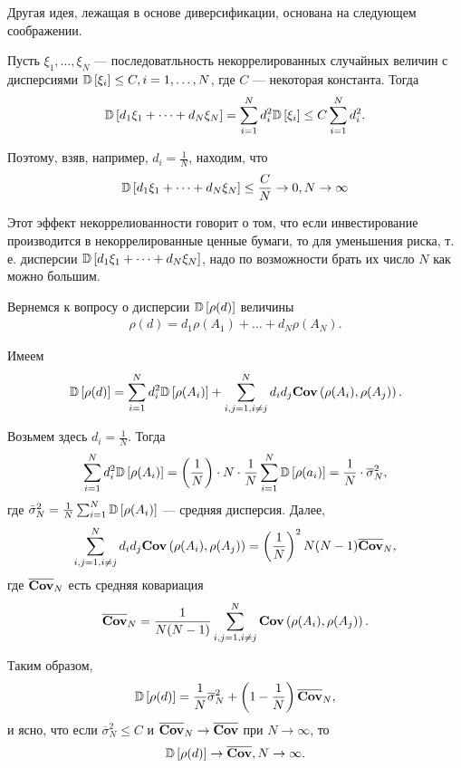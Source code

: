 Другая идея, лежащая в основе диверсификации, основана на следующем соображении.

Пусть $\xi_1, \dots, \xi_N$ --- последоватльность некоррелированных случайных величин с дисперсиями $\mathbb{D}\left[\xi_i\right] \le C, i=1, \dots, N$, 
где $C$ --- некоторая константа. Тогда
\begin{align}
\mathbb{D}\left[d_1 \xi_1 + \dots + d_N \xi_N\right] = \sum_{i=1}^{N} d_i^2 \mathbb{D}\left[\xi_i\right] \le C \sum_{i=1}^{N} d_i^2 .
\end{align}

Поэтому, взяв, например, $d_i = \frac{1}{N}$, находим, что
\begin{align}
\mathbb{D}\left[d_1 \xi_1 + \dots + d_N \xi_N\right] \le \frac{C}{N} \rightarrow 0, N \rightarrow \infty
\end{align}

Этот эффект некоррелиованности говорит о том, что если инвестирование производится в некоррелированные ценные бумаги, то для уменьшения риска,
т. е. дисперсии $\mathbb{D}\left[d_1 \xi_1 + \dots + d_N \xi_N\right]$, надо по возможности брать их число $N$ как можно большим.

Вернемся к вопросу о дисперсии $\mathbb{D}\left[\rho(d)\right]$ величины
\begin{align}
\rho(d) = d_1 \rho(A_1) + \dots + d_N \rho(A_N) .
\end{align}

Имеем
\begin{align}
\mathbb{D}\left[\rho(d)\right] = \sum_{i=1}^{N} d_i^2 \mathbb{D}\left[\rho(A_i)\right] + \sum_{i, j = 1, i \ne j}^{N} d_i d_j \textbf{Cov}\left(\rho(A_i), \rho(A_j)\right) .
\end{align}

Возьмем здесь $d_i = \frac{1}{N}$. Тогда
\begin{align}
\sum_{i=1}^{N} d_i^2 \mathbb{D}\left[\rho(A_i)\right] = 
	\left(\frac{1}{N}\right) \cdot N \cdot \frac{1}{N} \sum_{i=1}^{N} \mathbb{D}\left[\rho(a_i)\right] =
	\frac{1}{N} \cdot \overline{\sigma}_N^2 ,
\end{align}
где $\bar{\sigma}_N^2 = \frac{1}{N} \sum_{i=1}^{N} \mathbb{D}\left[\rho(A_i)\right]$ --- средняя дисперсия. Далее,
\begin{align}
\sum_{i, j = 1, i \ne j}^{N} d_i d_j \textbf{Cov}\left(\rho(A_i), \rho(A_j)\right) =
	\left(\frac{1}{N}\right)^2 N (N - 1) \overline{\textbf{Cov}}_N ,
\end{align}
где $\overline{\textbf{Cov}}_N$ есть средняя ковариация
\begin{align}
\overline{\textbf{Cov}}_N = \frac{1}{N (N - 1)} \sum_{i, j = 1, i \ne j}^{N} \textbf{Cov}\left(\rho(A_i), \rho(A_j)\right) .
\end{align}

Таким образом,
\begin{align}
\mathbb{D}\left[\rho(d)\right] = \frac{1}{N} \overline{\sigma}_N^2 + \left(1 - \frac{1}{N}\right) \overline{\textbf{Cov}}_N ,
\end{align}
и ясно, что если $\overline{\sigma}_N^2 \le C$ и $\overline{\textbf{Cov}}_N \rightarrow \overline{\textbf{Cov}}$ при $N \rightarrow \infty$, то
\begin{align}
\mathbb{D}\left[\rho(d)\right] \rightarrow \overline{\textbf{Cov}}, N \rightarrow \infty .
\end{align}

